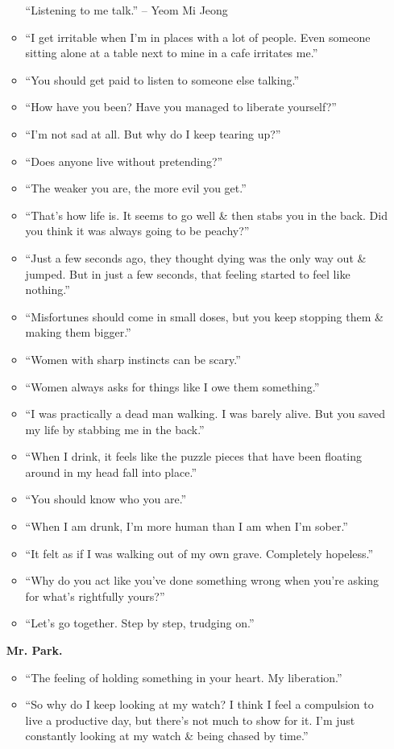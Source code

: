 \documentclass{article}
\begin{document}
\begin{enumerate}
\begin{itemize}
		``Listening to me talk.'' -- Yeom Mi Jeong
		\item ``I get irritable when I'm in places with a lot of people. Even someone sitting alone at a table next to mine in a cafe irritates me.''
		\item ``You should get paid to listen to someone else talking.''
		\item ``How have you been? Have you managed to liberate yourself?''
		\item ``I'm not sad at all. But why do I keep tearing up?''
		\item ``Does anyone live without pretending?''
		\item ``The weaker you are, the more evil you get.''
		\item ``That's how life is. It seems to go well \& then stabs you in the back. Did you think it was always going to be peachy?''
		\item ``Just a few seconds ago, they thought dying was the only way out \& jumped. But in just a few seconds, that feeling started to feel like nothing.''
		\item ``Misfortunes should come in small doses, but you keep stopping them \& making them bigger.''
		\item ``Women with sharp instincts can be scary.''
		\item ``Women always asks for things like I owe them something.''
		\item ``I was practically a dead man walking. I was barely alive. But you saved my life by stabbing me in the back.''
		\item ``When I drink, it feels like the puzzle pieces that have been floating around in my head fall into place.''
		\item ``You should know who you are.''
		\item ``When I am drunk, I'm more human than I am when I'm sober.''
		\item ``It felt as if I was walking out of my own grave. Completely hopeless.''
		\item ``Why do you act like you've done something wrong when you're asking for what's rightfully yours?''
		\item ``Let's go together. Step by step, trudging on.''
	\end{itemize}
	{\bf Mr. Park.}
	\begin{itemize}
		\item ``The feeling of holding something in your heart. My liberation.''
		\item ``So why do I keep looking at my watch? I think I feel a compulsion to live a productive day, but there's not much to show for it. I'm just constantly looking at my watch \& being chased by time.''

\end{itemize}
\end{enumerate}
\end{document}
